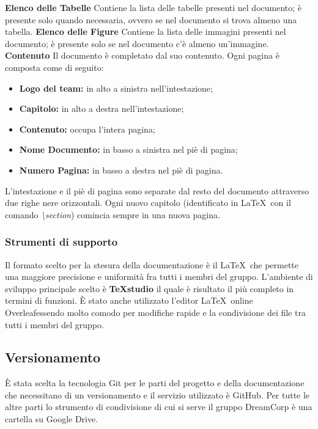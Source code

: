 		\newline \newline \textbf{Elenco delle Tabelle} Contiene la lista delle tabelle presenti nel documento; è presente solo quando necessaria, ovvero se nel documento si trova almeno una tabella.
		\newline \newline \textbf{Elenco delle Figure} Contiene la lista delle immagini presenti nel documento; è presente solo se nel documento c'è almeno un'immagine.
		\newline \newline \textbf{Contenuto}  Il documento è completato dal suo contenuto. Ogni pagina è composta come di seguito:\newline
		\begin{itemize}
			\item \textbf{Logo del team:} in alto a sinistra nell'intestazione;
			\item \textbf{Capitolo:} in alto a destra nell'intestazione;
			\item \textbf{Contenuto:} occupa l'intera pagina;
			\item \textbf{Nome Documento:} in basso a sinistra nel piè di pagina;
			\item \textbf{Numero Pagina:} in basso a destra nel piè di pagina. \newline
		\end{itemize}
		L'intestazione e il piè di pagina sono separate dal resto del documento attraverso due righe nere orizzontali. Ogni nuovo capitolo (identificato in \LaTeX ~con il comando \textit{\textbackslash{}section}) comincia sempre in una nuova pagina.
		\subsubsection{Strumenti di supporto}
		\label{3.1.8}
			Il formato scelto per la stesura della documentazione è il  \LaTeX\pedice ~che permette una maggiore precisione e uniformità fra tutti i membri del gruppo. L'ambiente di sviluppo principale scelto è \textbf{TeXstudio\pedice} il quale è risultato il più completo in termini di funzioni.
			È stato anche utilizzato l'editor \LaTeX ~online Overleaf\pedice essendo molto comodo per modifiche rapide e la condivisione dei file tra tutti i membri del gruppo.
	\subsection{Versionamento}
		È stata scelta la tecnologia Git per le parti del progetto e della documentazione che necessitano di un versionamento e il servizio utilizzato è GitHub. Per tutte le altre parti lo strumento di condivisione di cui si serve il gruppo DreamCorp è una cartella su Google Drive\pedice.
